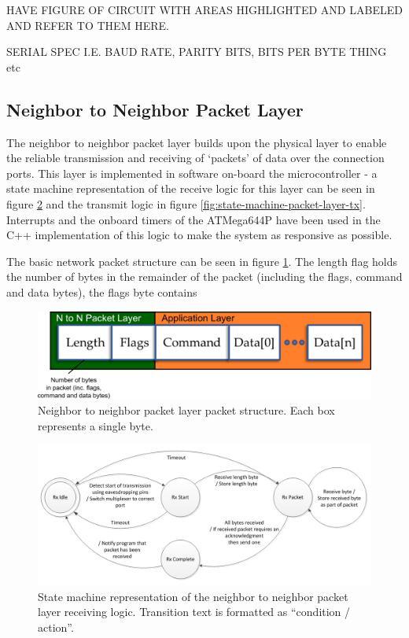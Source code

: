 HAVE FIGURE OF CIRCUIT WITH AREAS HIGHLIGHTED AND LABELED AND REFER TO THEM HERE.

SERIAL SPEC I.E. BAUD RATE, PARITY BITS, BITS PER BYTE THING etc

\subsection{Neighbor to Neighbor Packet Layer}

The neighbor to neighbor packet layer builds upon the physical layer to enable the reliable transmission and receiving of `packets' of data over the connection ports. This layer is implemented in software on-board the microcontroller - a state machine representation of the receive logic for this layer can be seen in figure \ref{fig:state-machine-packet-layer-rx} and the transmit logic in figure \ref{fig:state-machine-packet-layer-tx}. Interrupts and the onboard timers of the ATMega644P have been used in the C++ implementation of this logic to make the system as responsive as possible.

The basic network packet structure can be seen in figure \ref{fig:neighbor-neighbor-packet}. The length flag holds the number of bytes in the remainder of the packet (including the flags, command and data bytes), the flags byte contains 

\begin{figure}[h]
	\centering
	\includegraphics[width=1.0\textwidth]{Figures/neighbor-neighbor-packet.png}
	\caption{Neighbor to neighbor packet layer packet structure. Each box represents a single byte.}
	\label{fig:neighbor-neighbor-packet}    
\end{figure}

\begin{figure}[h]
	\centering
	\includegraphics[width=1.0\textwidth]{Figures/state-machine-packet-layer-rx.png}
	\caption{State machine representation of the neighbor to neighbor packet layer receiving logic. Transition text is formatted as ``condition / action''.}
	\label{fig:state-machine-packet-layer-rx}    
\end{figure}

